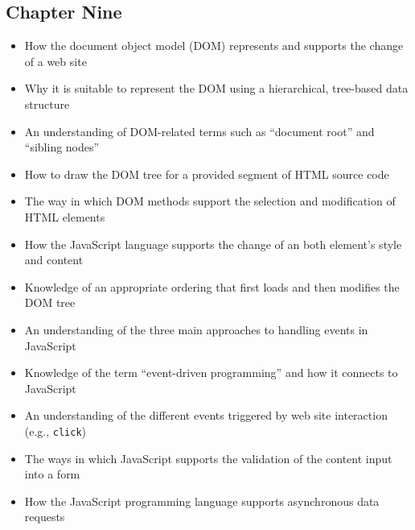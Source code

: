 \documentclass[11pt]{article}
\begin{document}
\vspace*{-.2in}
\subsection*{Chapter Nine}

\begin{itemize}

  \itemsep 0.05in

  \item How the document object model (DOM) represents and supports the
    change of a web site

  \item Why it is suitable to represent the DOM using a hierarchical, tree-based
    data structure

  \item An understanding of DOM-related terms such as ``document root'' and
    ``sibling nodes''

  \item How to draw the DOM tree for a provided segment of HTML source code

  \item The way in which DOM methods support the selection and modification of
    HTML elements

  \item How the JavaScript language supports the change of an both element's
    style and content

  \item Knowledge of an appropriate ordering that first loads and then modifies
    the DOM tree

  \item An understanding of the three main approaches to handling events in
    JavaScript

  \item Knowledge of the term ``event-driven programming'' and how it connects
    to JavaScript

  \item An understanding of the different events triggered by web site
    interaction (e.g., {\tt click})

  \item The ways in which JavaScript supports the validation of the content
    input into a form

  \item How the JavaScript programming language supports asynchronous data
    requests

\end{itemize}
\end{document}
